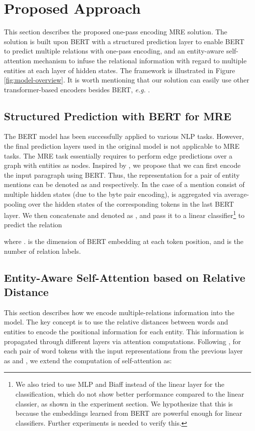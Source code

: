 \documentclass[11pt,a4paper]{article}
\begin{document}
\label{sec:proposed_approach}
\section{Proposed Approach}
This section describes the proposed one-pass encoding MRE solution.
The solution is built upon BERT with a structured prediction layer to enable BERT to predict multiple relations with one-pass encoding, and an entity-aware self-attention mechanism to infuse the relational information with regard to multiple entities at each layer of hidden states.  The framework is illustrated in Figure \ref{fig:model-overview}. It is worth mentioning that our solution can easily use other transformer-based encoders besides BERT, \emph{e.g.} \cite{radford2018improving}.  

\subsection{Structured Prediction with BERT for MRE}
\label{ssec:prediction}
The BERT model has been successfully applied to various NLP tasks. However, the final prediction layers used in the original model is not applicable to MRE tasks.  The MRE task essentially requires to perform edge predictions over a graph with entities as nodes.  Inspired by \cite{dozat2018simpler,ahmad2018near}, we propose that we can first encode the input paragraph using BERT. Thus, the representation for a pair of entity mentions   can be denoted as  and  respectively. In the case of a mention  consist of multiple hidden states (due to the byte pair encoding),   is aggregated via average-pooling over the hidden states of the corresponding tokens in the last BERT layer.   We then concatenate  and  denoted as , and pass it to a linear classifier\footnote{We also tried to use MLP and Biaff instead of the linear layer for the classification, which do not show better performance compared to the linear classier, as shown in the experiment section. We hypothesize that this is because the embeddings learned from BERT are powerful enough for linear classifiers. Further experiments is needed to verify this.} to predict the relation

where .  is the dimension of BERT embedding at each token position, and  is the number of relation labels.

\subsection{Entity-Aware Self-Attention based on Relative Distance}
\label{ssec:attention}
This section describes how we encode multiple-relations information into the model.  The key concept is to use the relative distances between words and entities to encode the positional information for each entity.  This information is propagated through different layers via attention computations.  Following \cite{shaw2018self}, for each pair of word tokens  with the input representations from the previous layer as  and ,  we extend the computation of self-attention  as:
\end{document}
